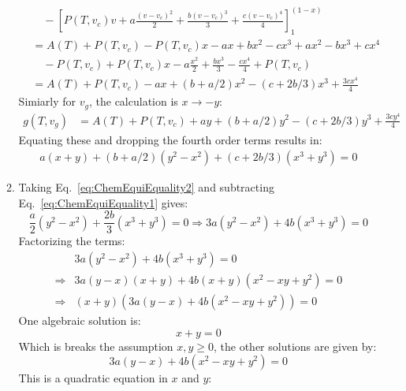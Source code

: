 \documentclass[12pt,a4]{article}
\begin{document}
\begin{enumerate}
\begin{enumerate}
\begin{align*}
                    & \quad - \left[ P(T, v_c)v + a \frac{(v - v_c)^2}{2} + \frac{b(v - v_c)^3}{3}  + \frac{c (v - v_c)^4}{4}\right]_1^{(1-x)}\\
                    &= A(T) + P(T, v_c) - P(T, v_c) x - a x + b x^2 - c x^3 + a x^2 - b x^3 + c x^4 \\
                    & \quad - P(T, v_c) + P(T, v_c) x - a \frac{x^2}{2} + \frac{bx^3}{3} - \frac{c x^4}{4} + P(T, v_c)\\
                    &= A(T) + P(T, v_c) - a x + (b + a / 2) x^2 - (c + 2 b / 3) x^3 + \frac{3 c x^4}{4}
        \end{align*}
        Simiarly for $v_g$, the calculation is $x \to -y$:
        \begin{align*}
          g(T, v_g) &= A(T) + P(T, v_c) + a y + (b + a / 2) y^2 - (c + 2 b / 3) y^3 + \frac{3 c y^4}{4}
        \end{align*}
        Equating these and dropping the fourth order terms results in:
        \begin{align}
          a (x + y)  + (b + a / 2) ( y^2 - x^2)  + (c + 2 b / 3) (x^3 + y ^3) = 0 \label{eq:ChemEquiEquality2}
        \end{align}
      \item
        Taking Eq.~\ref{eq:ChemEquiEquality2} and subtracting Eq.~\ref{eq:ChemEquiEquality1} gives:
        \begin{equation*}
          \frac{a}{2}(y^2 - x^2) + \frac{2 b}{3} (x^3 + y^3) = 0 \Rightarrow 3 a(y^2 - x^2) + 4 b (x^3 + y^3) = 0
        \end{equation*}
        Factorizing the terms:
        \begin{align*}
                      &3 a(y^2 - x^2) + 4 b (x^3 + y^3) = 0\\
          \Rightarrow &3 a(y - x)(x + y) + 4 b (x + y) (x^2  - xy + y^2) = 0\\
          \Rightarrow &(x + y)(3 a (y - x) + 4 b (x^2  - xy + y^2)) = 0
        \end{align*}
        One algebraic solution is:
        \begin{equation*}
          x + y = 0
        \end{equation*}
        Which is breaks the assumption $x, y \geq 0$, the other solutions are given by:
        \begin{equation*}
          3 a (y - x) + 4 b (x^2  - xy + y^2) = 0
        \end{equation*}
        This is a quadratic equation in $x$ and $y$:
        \begin{equation*}

\end{equation*}
\end{enumerate}
\end{enumerate}
\end{document}
